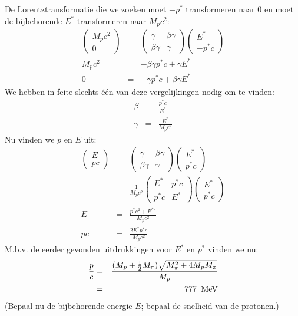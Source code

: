 De Lorentztransformatie die we zoeken moet $-p^{*}$ transformeren naar 0 en
moet de bijbehorende $E^{*}$ transformeren naar $M_{p}c^{2}$:
\begin{eqnarray*}
\left( \begin{array}{c}
M_{p}c^{2} \\
0 
\end{array} \right)
& = &
 \left( \begin{array}{cc}
\gamma & \beta \gamma  \\
\beta \gamma & \gamma
\end{array} \right) 
 \left( \begin{array}{c}
E^{*} \\
-p^{*}c 
\end{array} \right) 
\\
M_{p}c^{2} & = & -\beta \gamma p^{*}c + \gamma E^{*} \\
0 & = & -\gamma p^{*}c + \beta \gamma E^{*} 
\end{eqnarray*}
We hebben in feite slechts \'{e}\'{e}n van deze vergelijkingen nodig om te
vinden: 
\begin{eqnarray*}
\beta & = & \frac{p^{*}c}{E^{*}} \\
\gamma & = & \frac{E^{*}}{M_{p}c^{2}}
\end{eqnarray*}
Nu vinden we $p$ en $E$ uit:
\begin{eqnarray*}
\left( \begin{array}{c}
E \\
pc 
\end{array} \right) 
& = &
 \left( \begin{array}{cc}
\gamma & \beta \gamma  \\
\beta \gamma & \gamma
\end{array} \right) 
 \left( \begin{array}{c}
E^{*} \\
p^{*}c 
\end{array} \right) 
\\
& = & 
\frac{1}{M_{p}c^{2}}
 \left( \begin{array}{cc}
E^{*} & p^{*}c \\
p^{*}c & E^{*}
\end{array} \right) 
 \left( \begin{array}{c}
E^{*} \\
p^{*}c 
\end{array} \right) 
\\
E & = & \frac{p^{*}c^{2} + E^{*2}}{M_{p}c^{2}} \\
pc & = & \frac{2E^{*}p^{*}c}{M_{p}c^{2}} 
\end{eqnarray*}
M.b.v. de eerder gevonden uitdrukkingen voor $E^{*}$ en $p^{*}$ vinden we nu:
\begin{eqnarray*}
\frac{p}{c} & = & \frac{(M_{p} + \frac{1}{2}M_{\pi})\sqrt{M_{\pi}^{2} +
4M_{p}M_{\pi}}}{M_{p}} \\
& = & 777  \;\; {\rm MeV}
\end{eqnarray*}
(Bepaal nu de bijbehorende energie $E$; bepaal de snelheid van de protonen.)

